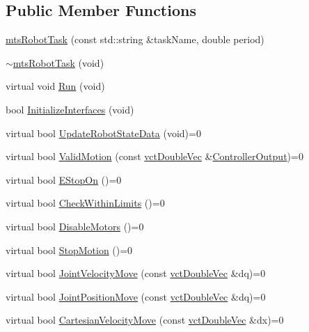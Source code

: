 \subsection*{Public Member Functions}
\begin{DoxyCompactItemize}
\item 
\hyperlink{classmts_robot_task_a979f05490a614e5c8f5fac858d9df124}{mts\+Robot\+Task} (const std\+::string \&task\+Name, double period)
\item 
\hyperlink{classmts_robot_task_a0b6b719c38e5efed8c3a69c688cf21e5}{$\sim$mts\+Robot\+Task} (void)
\item 
virtual void \hyperlink{classmts_robot_task_a7c6ceb57c621ab8d11a80de7519c9d9a}{Run} (void)
\item 
bool \hyperlink{classmts_robot_task_aa66512b6d30099ed89449889ecb26597}{Initialize\+Interfaces} (void)
\item 
virtual bool \hyperlink{classmts_robot_task_a1af7349c05645cb0044a7077202a1ce0}{Update\+Robot\+State\+Data} (void)=0
\item 
virtual bool \hyperlink{classmts_robot_task_a1a8a8be644f3c8563e3e21b27b42aac4}{Valid\+Motion} (const \hyperlink{vct_dynamic_vector_types_8h_ade4b3068c86fb88f41af2e5187e491c2}{vct\+Double\+Vec} \&\hyperlink{classmts_robot_task_aa263aa6c4baef69846e617cdca5cf91d}{Controller\+Output})=0
\item 
virtual bool \hyperlink{classmts_robot_task_acc7185144c7092c140702dc5a46bd176}{E\+Stop\+On} ()=0
\item 
virtual bool \hyperlink{classmts_robot_task_a91e9325ac08f5b07eea38434c2d6bbe4}{Check\+Within\+Limits} ()=0
\item 
virtual bool \hyperlink{classmts_robot_task_ae36c42cfe3a4e7371482c2c3e84c17fc}{Disable\+Motors} ()=0
\item 
virtual bool \hyperlink{classmts_robot_task_ac151cfa740af629eb9f63983c582981a}{Stop\+Motion} ()=0
\item 
virtual bool \hyperlink{classmts_robot_task_a17eaaf661fc37f1313071d64d9ee7e3f}{Joint\+Velocity\+Move} (const \hyperlink{vct_dynamic_vector_types_8h_ade4b3068c86fb88f41af2e5187e491c2}{vct\+Double\+Vec} \&dq)=0
\item 
virtual bool \hyperlink{classmts_robot_task_ae9665869aab61b998b7c5eef5e650ac0}{Joint\+Position\+Move} (const \hyperlink{vct_dynamic_vector_types_8h_ade4b3068c86fb88f41af2e5187e491c2}{vct\+Double\+Vec} \&dq)=0
\item 
virtual bool \hyperlink{classmts_robot_task_abec94c0fe8550d7034e822e03ada48c5}{Cartesian\+Velocity\+Move} (const \hyperlink{vct_dynamic_vector_types_8h_ade4b3068c86fb88f41af2e5187e491c2}{vct\+Double\+Vec} \&dx)=0

\end{DoxyCompactItemize}
